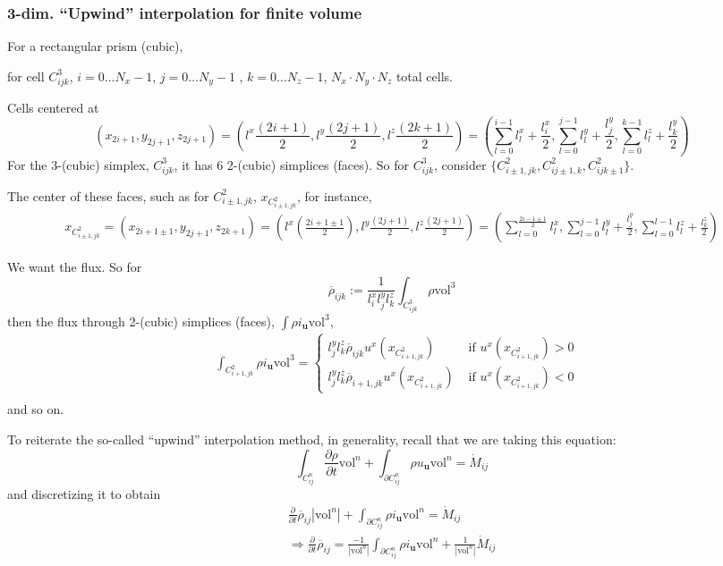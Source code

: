 \documentclass[10pt]{amsart}
\begin{document}
\begin{multicols*}{2}
\subsubsection{3-dim. ``Upwind'' interpolation for finite volume }

For a rectangular prism (cubic),

for cell $C^3_{ijk}$, $i=0 \dots N_x-1$, $j=0 \dots N_y-1$ , $k=0 \dots N_z-1$, $N_x\cdot N_y \cdot N_z$ total cells.

Cells centered at
\[
(x_{2i+1}, y_{2j+1}, z_{2j+1}) = (l^x \frac{ (2i+1)}{2} , l^y \frac{(2j+1)}{2}, l^z \frac{(2k+1)}{2} ) = \left( \sum_{l=0}^{i-1} l_l^x + \frac{l_i^x}{2} , \sum_{l=0}^{j-1}l_l^y + \frac{l_j^y}{2}, \sum_{l=0}^{k-1}l_l^z + \frac{l_k^y}{2}  \right)
\]
For the 3-(cubic) simplex, $C^3_{ijk}$, it has 6 2-(cubic) simplices (faces).  So for $C_{ijk}^3$, consider $\lbrace C^2_{i\pm 1, jk}, C^2_{ij\pm 1,k}, C^2_{ijk\pm 1}\rbrace$.

The center of these faces, such as for $C^2_{i\pm 1, jk}$, $x_{ C^2_{i\pm 1, jk} }$, for instance,
\[
\begin{aligned}
 x_{C^2_{i\pm 1,jk}} = (x_{2i+1\pm 1},y_{2j+1},z_{2k+1}) = (l^x\left( \frac{2i+1\pm 1}{2}\right) , l^y\frac{(2j+1)}{2},  l^z\frac{(2j+1)}{2} ) = \left( \sum_{l=0}^{ \frac{2i - 1 \pm 1 }{2} } l_l^x, \sum_{l=0}^{j-1} l_l^y + \frac{l_j^y}{2}, \sum_{l=0}^{l-1} l_l^z + \frac{l_k^z}{2} \right) 
  \end{aligned}
\]

We want the flux.  So for
\[
\overline{\rho}_{ijk} := \frac{1}{l_i^x l_j^yl^z_k} \int_{C^3_{ijk}} \rho \text{vol}^3
\]
then the flux through 2-(cubic) simplices (faces), $\int \rho i_{\mathbf{u}}\text{vol}^3$,
\[
\begin{aligned}
 &  \int_{C^2_{i+1,jk}} \rho i_{\mathbf{u}} \text{vol}^3 = \begin{cases} l_j^yl_k^z \overline{\rho}_{ijk} u^x(x_{C^2_{i+1, jk} } ) & \text{ if } u^x(x_{C^2_{i+1,jk} }) > 0 \\ 
 l_j^y l^z_k \overline{\rho}_{i+1,jk} u^x(x_{C^2_{i+1, jk} } ) & \text{ if } u^x(x_{C^2_{i+1,jk} }) < 0 \end{cases} \\
\end{aligned}
\]
and so on.  

To reiterate the so-called ``upwind'' interpolation method, in generality, recall that we are taking this equation:
\[
\int_{C^n_{ij}} \frac{ \partial \rho }{ \partial t} \text{vol}^n + \int_{ \partial C^n_{ij} } \rho u_{\mathbf{u}} \text{vol}^n = \dot{M}_{ij}
\]
and discretizing it to obtain
\[
\begin{gathered}
  \frac{ \partial }{ \partial t} \overline{\rho}_{ij} | \text{vol}^n | + \int_{ \partial C_{ij}^n } \rho i_{\mathbf{u}} \text{vol}^n = \dot{M}_{ij } \\ 
\Longrightarrow  \frac{ \partial }{ \partial t} \overline{\rho}_{ij}  = \frac{-1}{ | \text{vol}^n | } \int_{ \partial C_{ij}^n } \rho i_{\mathbf{u}} \text{vol}^n + \frac{1}{ | \text{vol}^n | } \dot{M}_{ij }
  \end{gathered}
\]


\end{multicols*}
\end{document}
